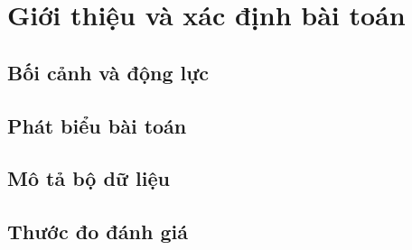\section{Giới thiệu và xác định bài toán}
\label{sec:intro}

\subsection{Bối cảnh và động lực}

\subsection{Phát biểu bài toán}

\subsection{Mô tả bộ dữ liệu}

\subsection{Thước đo đánh giá}

